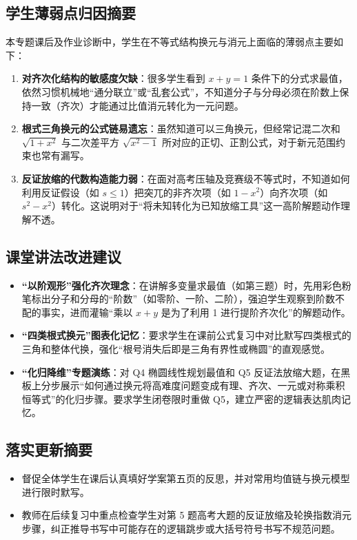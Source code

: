 \documentclass[12pt,a4paper]{ctexart}
\begin{document}
\subsection{学生薄弱点归因摘要}
本专题课后及作业诊断中，学生在不等式结构换元与消元上面临的薄弱点主要如下：
\begin{enumerate}[label=\arabic*. , leftmargin=2em, itemsep=0.1em, topsep=0.2em]
  \item \textbf{对齐次化结构的敏感度欠缺}：很多学生看到 \(x+y=1\) 条件下的分式求最值，依然习惯机械地“通分联立”或“乱套公式”，不知道分子与分母必须在阶数上保持一致（齐次）才能通过比值消元转化为一元问题。
  \item \textbf{根式三角换元的公式链易遗忘}：虽然知道可以三角换元，但经常记混二次和 \(\sqrt{1+x^2}\) 与二次差平方 \(\sqrt{x^2-1}\) 所对应的正切、正割公式，对于新元范围约束也常有漏写。
  \item \textbf{反证放缩的代数构造能力弱}：在面对高考压轴及竞赛级不等式时，不知道如何利用反证假设（如 \(s \leqslant 1\)）把突兀的非齐次项（如 \(1-x^2\)）向齐次项（如 \(s^2-x^2\)）转化。这说明对于“将未知转化为已知放缩工具”这一高阶解题动作理解不透。
\end{enumerate}

\subsection{课堂讲法改进建议}
\begin{itemize}[leftmargin=2em, itemsep=0.1em, topsep=0.2em]
  \item \textbf{“以阶观形”强化齐次理念}：在讲解多变量求最值（如第三题）时，先用彩色粉笔标出分子和分母的“阶数”（如零阶、一阶、二阶），强迫学生观察到阶数不配的事实，进而灌输“乘以 \(x+y\) 是为了利用 1 进行提阶齐次化”的解题动作。
  \item \textbf{“四类根式换元”图表化记忆}：要求学生在课前公式复习中对比默写四类根式的三角和整体代换，强化“根号消失后即是三角有界性或椭圆”的直观感觉。
  \item \textbf{“化归降维”专题演练}：对 Q4 椭圆线性规划最值和 Q5 反证法放缩大题，在黑板上分步展示“如何通过换元将高难度问题变成有理、齐次、一元或对称乘积恒等式”的化归步骤。要求学生闭卷限时重做 Q5，建立严密的逻辑表达肌肉记忆。
\end{itemize}

\subsection{落实更新摘要}
\begin{itemize}[leftmargin=2em, itemsep=0.1em, topsep=0.2em]
  \item 督促全体学生在课后认真填好学案第五页的反思，并对常用均值链与换元模型进行限时默写。
  \item 教师在后续复习中重点检查学生对第 5 题高考大题的反证放缩及轮换指数消元步骤，纠正推导书写中可能存在的逻辑跳步或大括号符号书写不规范问题。
\end{itemize}

\endgroup
\end{document}
